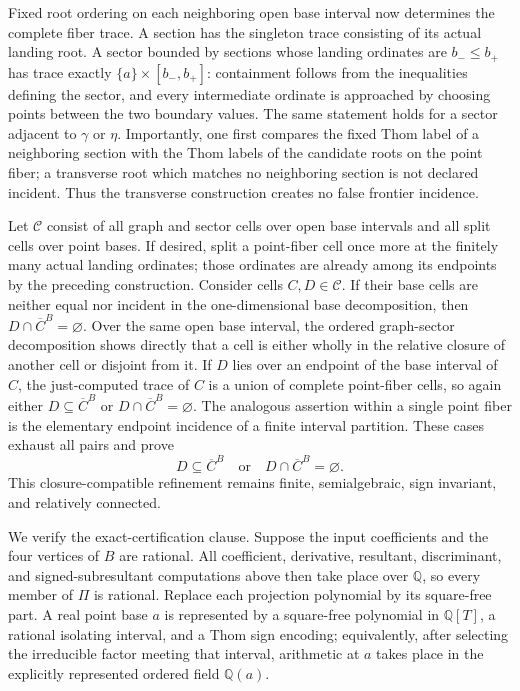 Fixed root ordering on each neighboring open base interval now determines the complete fiber trace.  A section has the singleton trace consisting of its actual landing root.  A sector bounded by sections whose landing ordinates are \(b_-\leq b_+\) has trace exactly \(\{a\}\times[b_-,b_+]\): containment follows from the inequalities defining the sector, and every intermediate ordinate is approached by choosing points between the two boundary values.  The same statement holds for a sector adjacent to \(\gamma\) or \(\eta\).  Importantly, one first compares the fixed Thom label of a neighboring section with the Thom labels of the candidate roots on the point fiber; a transverse root which matches no neighboring section is not declared incident.  Thus the transverse construction creates no false frontier incidence.

Let \(\mathscr C\) consist of all graph and sector cells over open base intervals and all split cells over point bases.  If desired, split a point-fiber cell once more at the finitely many actual landing ordinates; those ordinates are already among its endpoints by the preceding construction.  Consider cells \(C,D\in\mathscr C\).  If their base cells are neither equal nor incident in the one-dimensional base decomposition, then \(D\cap\overline C^{B}=\varnothing\).  Over the same open base interval, the ordered graph-sector decomposition shows directly that a cell is either wholly in the relative closure of another cell or disjoint from it.  If \(D\) lies over an endpoint of the base interval of \(C\), the just-computed trace of \(C\) is a union of complete point-fiber cells, so again either \(D\subseteq\overline C^{B}\) or \(D\cap\overline C^{B}=\varnothing\).  The analogous assertion within a single point fiber is the elementary endpoint incidence of a finite interval partition.  These cases exhaust all pairs and prove
\[
D\subseteq\overline C^{B}
\quad\text{or}\quad
D\cap\overline C^{B}=\varnothing.
\]
This closure-compatible refinement remains finite, semialgebraic, sign invariant, and relatively connected.

We verify the exact-certification clause.  Suppose the input coefficients and the four vertices of \(B\) are rational.  All coefficient, derivative, resultant, discriminant, and signed-subresultant computations above then take place over \(\mathbb Q\), so every member of \(\Pi\) is rational.  Replace each projection polynomial by its square-free part.  A real point base \(a\) is represented by a square-free polynomial in \(\mathbb Q[T]\), a rational isolating interval, and a Thom sign encoding; equivalently, after selecting the irreducible factor meeting that interval, arithmetic at \(a\) takes place in the explicitly represented ordered field \(\mathbb Q(a)\).

